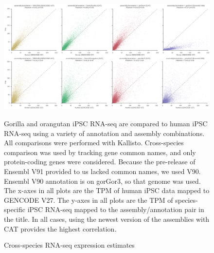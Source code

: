 \begin{figure}
\includegraphics[width=0.8\paperwidth,keepaspectratio]{Supplemental_Figure_S4.pdf}
\caption{Cross-species RNA-seq expression estimates}

Gorilla and orangutan iPSC RNA-seq are compared to human iPSC RNA-seq using a variety of annotation and assembly combinations. All comparisons were performed with Kallisto. Cross-species comparison was used by tracking gene common names, and only protein-coding genes were considered. Because the pre-release of Ensembl V91 provided to us lacked common names, we used V90. Ensembl V90 annotation is on gorGor3, so that genome was used. The x-axes in all plots are the TPM of human iPSC data mapped to GENCODE V27. The y-axes in all plots are the TPM of species-specific iPSC RNA-seq mapped to the assembly/annotation pair in the title. In all cases, using the newest version of the assemblies with CAT provides the highest correlation.
\label{supp_fig:primate_expression}
\end{figure}

